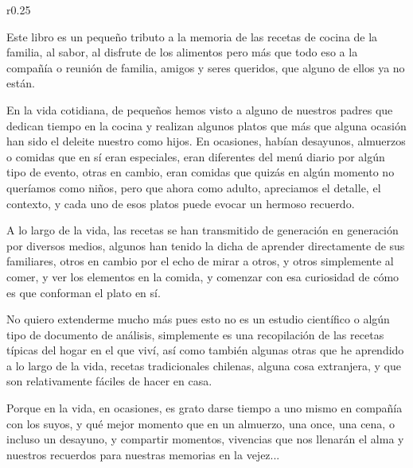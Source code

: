 \thispagestyle{empty}

\begin{wrapfigure}{r}{0.25\textwidth}
\end{wrapfigure} 

Este libro es un pequeño tributo a la memoria de las recetas de cocina de la familia, al sabor, al disfrute de los alimentos pero más que todo eso a la compañía o reunión de familia, amigos y seres queridos, que alguno de ellos
ya no están. 

En la vida cotidiana, de pequeños hemos visto a alguno de nuestros padres que dedican tiempo en la cocina y realizan algunos platos que más que alguna ocasión han sido el deleite nuestro como hijos. En ocasiones, habían desayunos, almuerzos o comidas que en sí eran especiales, eran diferentes del menú diario por algún tipo de evento, otras en cambio, eran comidas que quizás en algún momento no queríamos como niños, pero que ahora como adulto, apreciamos el detalle, el contexto, y cada uno de esos platos puede evocar un hermoso recuerdo.

A lo largo de la vida, las recetas se han transmitido de generación en generación por diversos medios, algunos han tenido la dicha de aprender directamente de sus familiares, otros en cambio por el echo de mirar a otros, y otros simplemente al comer, y ver los elementos en la comida, y comenzar con esa curiosidad de cómo es que conforman el plato en sí. 

No quiero extenderme mucho más pues esto no es un estudio científico o algún tipo de documento de análisis,  simplemente es una recopilación de las recetas típicas del hogar en el que viví, así como también algunas otras que he aprendido a lo largo de la vida, recetas tradicionales chilenas, alguna cosa extranjera, y que son relativamente fáciles de hacer en casa.

Porque en la vida, en ocasiones, es grato darse tiempo a uno mismo en compañía con los suyos, y qué mejor momento que en un almuerzo, una once, una cena, o incluso un desayuno, y compartir momentos, vivencias que nos llenarán el alma y nuestros recuerdos para nuestras memorias en la vejez...
